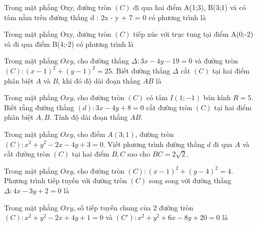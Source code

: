\documentclass[12pt,a4paper]{book}
\begin{document}
\begin{ex}
Trong mặt phẳng Oxy, đường tròn $(C)$ đi qua hai điểm A(1;3), B(3;1) và có tâm nằm trên đường thẳng d : 2x - y + 7 = 0 có phương trình là
\loigiai{}
\end{ex}

\begin{ex}
Trong mặt phẳng Oxy, đường tròn $(C)$ tiếp xúc với trục tung tại điểm A(0;-2) và đi qua điểm B(4;-2) có phương trình là
\loigiai{}
\end{ex}

\begin{ex}
Trong mặt phẳng $Oxy$, cho đường thẳng $\Delta : 3x - 4y - 19 = 0$ và đường tròn $(C): (x-1)^2 + (y-1)^2 = 25$. Biết đường thẳng $\Delta$ cắt $(C)$ tại hai điểm phân biệt $A$ và $B$, khi đó độ dài đoạn thẳng $AB$ là
\loigiai{}
\end{ex}

\begin{ex}
Trong mặt phẳng $Oxy$, cho đường tròn $(C)$ có tâm $I(1;-1)$ bán kính $R = 5$. Biết rằng đường thẳng $(d): 3x - 4y + 8 = 0$ cắt đường tròn $(C)$ tại hai điểm phân biệt $A, B$. Tính độ dài đoạn thẳng $AB$.
\loigiai{}
\end{ex}

\begin{ex}
Trong mặt phẳng $Oxy$, cho điểm $A(3;1)$, đường tròn $(C): x^2 + y^2 - 2x - 4y + 3 = 0$. Viết phương trình đường thẳng $ d $ đi qua $A$ và cắt đường tròn $(C)$ tại hai điểm $B, C$ sao cho $BC = 2\sqrt{2}$.
\loigiai{}
\end{ex}

\begin{ex}
Trong mặt phẳng $Oxy$, cho đường tròn $(C): (x-1)^2 + (y-4)^2 = 4$. Phương trình tiếp tuyến với đường tròn $(C)$ song song với đường thẳng $\Delta : 4x - 3y + 2 = 0$ là
\loigiai{}
\end{ex}

\begin{ex}
Trong mặt phẳng $Oxy$, số tiếp tuyến chung của 2 đường tròn $(C): x^2 + y^2 - 2x + 4y + 1 = 0$ và $(C'): x^2 + y^2 + 6x - 8y + 20 = 0$ là
\loigiai{}
\end{ex}
\end{document}
